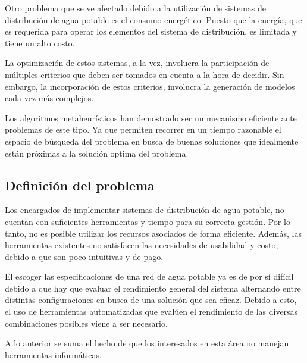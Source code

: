 \documentclass[11pt,letterpaper]{article}
\begin{document}
Otro problema que se ve afectado debido a la utilización de sistemas de distribución de agua potable es el consumo energético. Puesto que la energía, que es requerida para operar los elementos del sistema de distribución, es limitada y tiene un alto costo.

La optimización de estos sistemas, a la vez, involucra la participación de múltiples criterios que deben ser tomados en cuenta a la hora de decidir. Sin embargo, la incorporación de estos criterios, involucra la generación de modelos cada vez más complejos.

Los algoritmos metaheurísticos han demostrado ser un mecanismo eficiente ante problemas de este tipo. Ya que permiten recorrer en un tiempo razonable el espacio de búsqueda del problema en busca de buenas soluciones que idealmente están próximas a la solución optima del problema.

\subsection{Definición del problema} 

Los encargados de implementar sistemas de distribución de agua potable, no cuentan con suficientes herramientas y  tiempo para su correcta gestión. Por lo tanto, no es posible utilizar los recursos asociados de forma eficiente. Además, las herramientas existentes no satisfacen las necesidades de usabilidad y costo, debido a que son poco intuitivas y de pago.

El escoger las especificaciones de una red de agua potable ya es de por sí difícil debido a que hay que evaluar el rendimiento general del sistema alternando entre distintas configuraciones en busca de una solución que sea eficaz. Debido a esto, el uso de herramientas automatizadas que evalúen el rendimiento de las diversas combinaciones posibles viene a ser necesario.

A lo anterior se suma el hecho de que los interesados en esta área no manejan herramientas informáticas.

\end{document}
